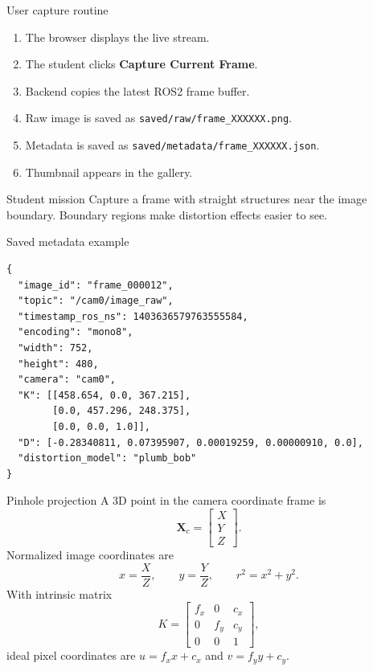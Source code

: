 \documentclass[aspectratio=169,10pt]{beamer}
\newcommand{\code}[1]{\texttt{#1}}
\begin{document}
\begin{frame}{User capture routine}
  \begin{enumerate}
    \item The browser displays the live stream.
    \item The student clicks \textbf{Capture Current Frame}.
    \item Backend copies the latest ROS2 frame buffer.
    \item Raw image is saved as \code{saved/raw/frame\_XXXXXX.png}.
    \item Metadata is saved as \code{saved/metadata/frame\_XXXXXX.json}.
    \item Thumbnail appears in the gallery.
  \end{enumerate}
  \vspace{0.7em}
  \begin{block}{Student mission}
    Capture a frame with straight structures near the image boundary. Boundary regions make distortion effects easier to see.
  \end{block}
\end{frame}

\begin{frame}[fragile]{Saved metadata example}
  \begin{lstlisting}
{
  "image_id": "frame_000012",
  "topic": "/cam0/image_raw",
  "timestamp_ros_ns": 1403636579763555584,
  "encoding": "mono8",
  "width": 752,
  "height": 480,
  "camera": "cam0",
  "K": [[458.654, 0.0, 367.215],
        [0.0, 457.296, 248.375],
        [0.0, 0.0, 1.0]],
  "D": [-0.28340811, 0.07395907, 0.00019259, 0.00000910, 0.0],
  "distortion_model": "plumb_bob"
}
  \end{lstlisting}
\end{frame}

\begin{frame}{Pinhole projection}
  A 3D point in the camera coordinate frame is
  \[
    \mathbf{X}_c = \begin{bmatrix} X \\ Y \\ Z \end{bmatrix}.
  \]
  Normalized image coordinates are
  \[
    x = \frac{X}{Z}, \qquad y = \frac{Y}{Z}, \qquad r^2 = x^2 + y^2.
  \]
  With intrinsic matrix
  \[
    K = \begin{bmatrix}
      f_x & 0 & c_x \\
      0 & f_y & c_y \\
      0 & 0 & 1
    \end{bmatrix},
  \]
  ideal pixel coordinates are $u = f_x x + c_x$ and $v = f_y y + c_y$.
\end{frame}
\end{document}
